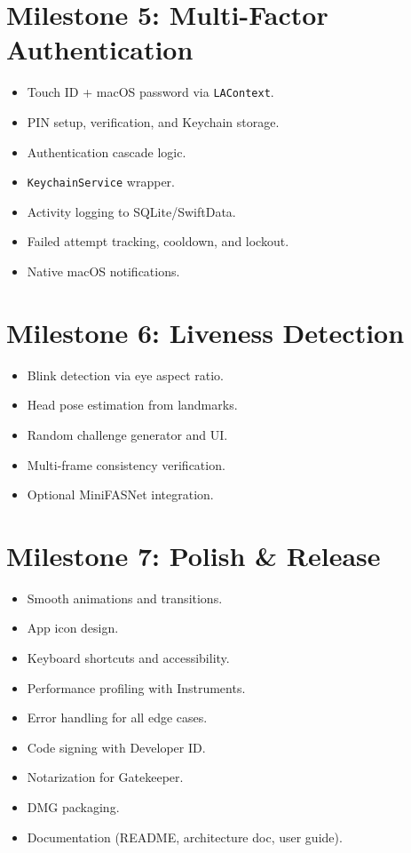 \documentclass[12pt,a4paper]{report}
\begin{document}
\section{Milestone 5: Multi-Factor Authentication}
\begin{itemize}[noitemsep]
    \item Touch ID + macOS password via \texttt{LAContext}.
    \item PIN setup, verification, and Keychain storage.
    \item Authentication cascade logic.
    \item \texttt{KeychainService} wrapper.
    \item Activity logging to SQLite/SwiftData.
    \item Failed attempt tracking, cooldown, and lockout.
    \item Native macOS notifications.
\end{itemize}

\section{Milestone 6: Liveness Detection}
\begin{itemize}[noitemsep]
    \item Blink detection via eye aspect ratio.
    \item Head pose estimation from landmarks.
    \item Random challenge generator and UI.
    \item Multi-frame consistency verification.
    \item Optional MiniFASNet integration.
\end{itemize}

\section{Milestone 7: Polish \& Release}
\begin{itemize}[noitemsep]
    \item Smooth animations and transitions.
    \item App icon design.
    \item Keyboard shortcuts and accessibility.
    \item Performance profiling with Instruments.
    \item Error handling for all edge cases.
    \item Code signing with Developer ID.
    \item Notarization for Gatekeeper.
    \item DMG packaging.
    \item Documentation (README, architecture doc, user guide).
\end{itemize}
\end{document}
